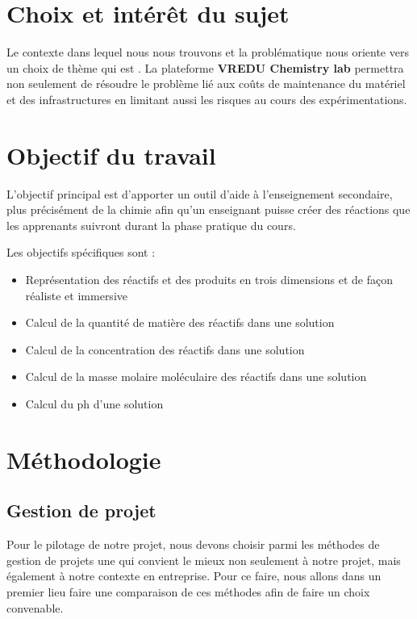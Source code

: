 \section{Choix et intérêt du sujet}

Le contexte dans lequel nous nous trouvons et la problématique nous oriente vers un
choix de thème qui est \textbf{\og \theme \fg}.
La plateforme \textbf{VREDU Chemistry lab} permettra non seulement de résoudre le problème lié aux coûts de maintenance
du matériel et des infrastructures en limitant aussi les risques au cours des expérimentations.

\section{Objectif du travail}

L’objectif principal est d'apporter un outil d'aide à l'enseignement secondaire, plus précisément de la chimie afin qu'un enseignant puisse créer des réactions que les apprenants suivront durant la phase pratique du cours.

Les objectifs spécifiques sont :

\begin{itemize}
	\item Représentation des réactifs et des produits en trois dimensions et de façon réaliste et immersive
	\item Calcul de la quantité de matière des réactifs dans une solution
	\item Calcul de la concentration des réactifs dans une solution
	\item Calcul de la masse molaire moléculaire des réactifs dans une solution
	\item Calcul du ph d’une solution
\end{itemize}

\section{Méthodologie}

\subsection{Gestion de projet}

Pour le pilotage de notre projet, nous devons choisir parmi les méthodes de gestion de projets une qui convient le mieux non seulement à notre projet, mais également à notre contexte en entreprise.
Pour ce faire, nous allons dans un premier lieu faire une comparaison de ces
méthodes afin de faire un choix convenable.

